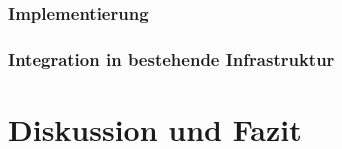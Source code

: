 \documentclass[a4paper, 12pt, oneside]{scrbook}
\begin{document}
		\subsection{Implementierung}
		
			
		
		\subsection{Integration in bestehende Infrastruktur}
			

	
	
	\chapter{Diskussion und Fazit}\label{ch:Diskussion_Fazit}
	
	
	
	
	\frontmatter
	\printbibliography
\end{document}
